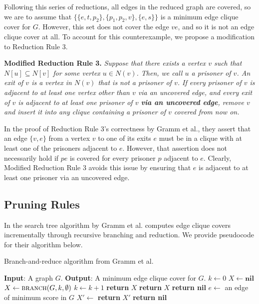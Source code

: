 \documentclass[12pt]{article}
\begin{document}
    Following this series of reductions, all edges in the reduced graph are covered, so we are to assume that $\{\{e, t, p_2\}, \{p_1, p_2, v\}, \{e, s\}\}$ is a minimum edge clique cover for $G$.
    However, this set does not cover the edge $ve$, and so it is not an edge clique cover at all.
    To account for this counterexample, we propose a modification to Reduction Rule 3.
    
   \medskip\noindent\textbf{Modified Reduction Rule 3.} {\it Suppose that there exists a vertex $v$ such that $N[u] \subseteq N[v]$ for some vertex $u \in N(v)$.
        Then, we call $u$ a prisoner of $v$.
        An exit of $v$ is a vertex in $N(v)$ that is not a prisoner of $v$.
        If every prisoner of $v$ is adjacent to at least one vertex other than $v$ via an uncovered edge, and every exit of $v$ is adjacent to at least one prisoner of $v$ {\bf via an uncovered edge}, remove $v$ and insert it into any clique containing a prisoner of $v$ covered from now on.}
    \medskip

    In the proof of Reduction Rule 3's correctness by Gramm et al., they assert that an edge $\{v, e\}$ from a vertex $v$ to one of its exits $e$ must be in a clique with at least one of the prisoners adjacent to $e$.
    However, that assertion does not necessarily hold if $pe$ is covered for every prisoner $p$ adjacent to $e$.
    Clearly, Modified Reduction Rule 3 avoids this issue by ensuring that $e$ is adjacent to at least one prisoner via an uncovered edge.

\subsection*{Pruning Rules}

    In the search tree algorithm by Gramm et al. computes edge clique covers incrementally through recursive branching and reduction.
    We provide pseudocode for their algorithm below. %
    \begin{algorithm}
    \caption{Branch-and-reduce algorithm from Gramm et al.}    
    \begin{algorithmic}
        \State \textbf{Input}: A graph $G$.
        \State \textbf{Output}: A minimum edge clique cover for $G$.
        \State $k \gets 0$
        \State $X \gets \textbf{nil}$
            \State $X \gets \Call{branch}{G, k, \emptyset}$
            \State $k \gets k + 1$
        \EndWhile
        \State \textbf{return} $X$
            \State \textbf{return} $X$
            \EndIf
            \State {}
                \State \textbf{return nil}
            \EndIf
            \State $e \gets$ an edge of minimum score in $G$
                \State $X' \gets$ 
                    \State \textbf{return} $X'$
                \EndIf
            \EndFor
            \State \textbf{return nil}
        \EndFunction
    \end{algorithmic}
    \end{algorithm}
    
\end{document}
